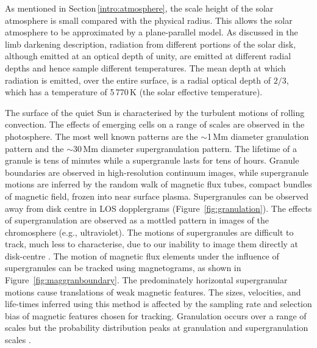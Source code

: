 As mentioned in Section\,\ref{intro:atmosphere}, the scale height of the solar atmosphere is small compared with the physical radius. This allows the solar atmosphere to be approximated by a plane-parallel model. As discussed in the limb darkening description, radiation from different portions of the solar disk, although emitted at an optical depth of unity, are emitted at different radial depths and hence sample different temperatures. The mean depth at which radiation is emitted, over the entire surface, is a radial optical depth of $2/3$, which has a temperature of 5\,770\,K (the solar effective temperature).


The surface of the quiet Sun is characterised by the turbulent motions of rolling convection. The effects of emerging cells on a range of scales are observed in the photosphere. The most well known patterns are the $\sim$1\,Mm diameter granulation pattern and the $\sim$30\,Mm diameter supergranulation pattern. The lifetime of a granule is tens of minutes while a supergranule lasts for tens of hours. Granule boundaries are observed in high-resolution continuum images, while supergranule motions are inferred by the random walk of magnetic flux tubes, compact bundles of magnetic field, frozen into near surface plasma. Supergranules can be observed away from disk centre in \gls{LOS} dopplergrams (Figure~\ref{fig:granulation}). The effects of supergranulation are observed as a mottled pattern in images of the chromosphere (e.g., ultraviolet). The motions of supergranules are difficult to track, much less to characterise, due to our inability to image them directly at disk-centre \citep[see][and references therein]{Rieutord:2010}. The motion of magnetic flux elements under the influence of supergranules can be tracked using magnetograms, as shown in Figure~\ref{fig:maggranboundary}. The predominately horizontal supergranular motions cause translations of weak magnetic features. The sizes, velocities, and life-times inferred using this method is affected by the sampling rate and selection bias of magnetic features chosen for tracking. Granulation occurs over a range of scales but the probability distribution peaks at granulation and supergranulation scales \citep{Rieutord:2008}. 

